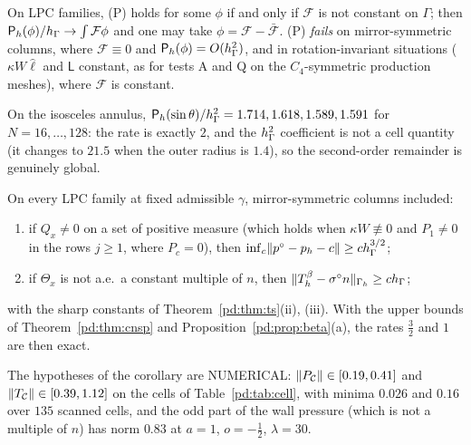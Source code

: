 \begin{corollary}\label{pd:cor:P}
On LPC families, (P) holds for some $\phi$ if and only if $\mathcal F$ is not constant on $\Gamma$; then $\mathsf P_h(\phi)/h_\Gamma\to\int\mathcal F\phi$ and one may take $\phi=\mathcal F-\bar{\mathcal F}$. (P) \emph{fails} on mirror-symmetric columns, where $\mathcal F\equiv0$ and $\mathsf P_h(\phi)=O(h_\Gamma^2)$, and in rotation-invariant situations ($\kappa W\hat\ell$ and $\mathsf L$ constant, as for tests A and Q on the $C_4$-symmetric production meshes), where $\mathcal F$ is constant.
\end{corollary}

On the isosceles annulus, $\mathsf P_h(\sin\theta)/h_\Gamma^2=1.714,1.618,1.589,1.591$ for $N=16,\dots,128$: the rate is exactly $2$, and the $h_\Gamma^2$ coefficient is not a cell quantity (it changes to $21.5$ when the outer radius is $1.4$), so the second-order remainder is genuinely global.

\begin{corollary}\label{pd:cor:ac}
On every LPC family at fixed admissible $\gamma$, mirror-symmetric columns included:
\begin{enumerate}[label=(\alph*)]
\item if $Q_x\ne0$ on a set of positive measure (which holds when $\kappa W\not\equiv0$ and $P_1\ne0$ in the rows $j\ge1$, where $P_c=0$), then $\inf_c\lVert p^\circ-p_h-c\rVert\ge ch_\Gamma^{3/2}$;
\item if $\Theta_x$ is not a.e.\ a constant multiple of $n$, then $\lVert T^\beta_h-\sigma^\circ n\rVert_{\Gamma_h}\ge ch_\Gamma$;
\end{enumerate}
with the sharp constants of Theorem~\ref{pd:thm:ts}(ii), (iii). With the upper bounds of Theorem~\ref{pd:thm:cnsp} and Proposition~\ref{pd:prop:beta}(a), the rates $\frac32$ and $1$ are then exact.
\end{corollary}

The hypotheses of the corollary are NUMERICAL: $\lVert P_{\mathcal C}\rVert\in[0.19,0.41]$ and $\lVert T_{\mathcal C}\rVert\in[0.39,1.12]$ on the cells of Table~\ref{pd:tab:cell}, with minima $0.026$ and $0.16$ over $135$ scanned cells, and the odd part of the wall pressure (which is not a multiple of $n$) has norm $0.83$ at $a=1$, $o=-\frac12$, $\lambda=30$.

